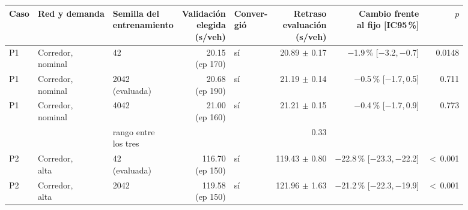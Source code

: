 \begin{table}[H]
\centering
\scriptsize
\setlength{\tabcolsep}{3pt}
\begin{tabular}{lllrlrrr}
\toprule
Caso & Red y demanda & \makecell{Semilla del\\entrenamiento} & \makecell{Validación\\elegida\\(s/veh)} & \makecell{Conver-\\gió} & \makecell{Retraso\\evaluación\\(s/veh)} & \makecell{Cambio frente\\al fijo [IC95\,\%]} & $p$ \\
\midrule
P1 & \makecell[l]{Corredor,\\{}nominal} & 42 & \makecell[r]{20.15\\{}(ep 170)} & sí & \makecell[r]{20.89\\{}$\pm$ 0.17} & \makecell[r]{$-$1.9\,\%\\{}[$-$3.2,\,$-$0.7]} & 0.0148 \\
P1 & \makecell[l]{Corredor,\\{}nominal} & \makecell[l]{2042\\{}(evaluada)} & \makecell[r]{20.68\\{}(ep 190)} & sí & \makecell[r]{21.19\\{}$\pm$ 0.14} & \makecell[r]{$-$0.5\,\%\\{}[$-$1.7,\,0.5]} & 0.711 \\
P1 & \makecell[l]{Corredor,\\{}nominal} & 4042 & \makecell[r]{21.00\\{}(ep 160)} & sí & \makecell[r]{21.21\\{}$\pm$ 0.15} & \makecell[r]{$-$0.4\,\%\\{}[$-$1.7,\,0.9]} & 0.773 \\
 & & \makecell[l]{rango entre\\{}los tres} & & & 0.33 & & \\
P2 & \makecell[l]{Corredor,\\{}alta} & \makecell[l]{42\\{}(evaluada)} & \makecell[r]{116.70\\{}(ep 150)} & sí & \makecell[r]{119.43\\{}$\pm$ 0.80} & \makecell[r]{$-$22.8\,\%\\{}[$-$23.3,\,$-$22.2]} & $<$\,0.001 \\
P2 & \makecell[l]{Corredor,\\{}alta} & 2042 & \makecell[r]{119.58\\{}(ep 150)} & sí & \makecell[r]{121.96\\{}$\pm$ 1.63} & \makecell[r]{$-$21.2\,\%\\{}[$-$22.3,\,$-$19.9]} & $<$\,0.001 \\

\end{tabular}
\end{table}
